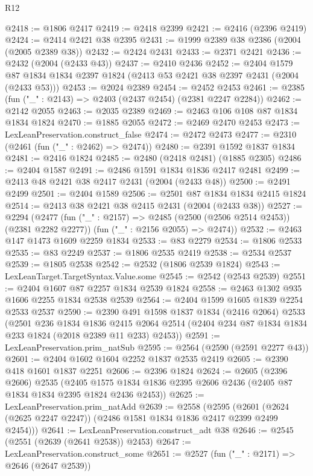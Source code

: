 \begin{lexlean}{R12}
\begin{coremodule}
@2418 := @1806 @2417
@2419 := @2418 @2399
@2421 := @2416 (@2396 @2419)
@2424 := @2414 @2421 @38 @2395
@2431 := @1999 @2389 @38 @2386 (@2004 (@2005 @2389 @38))
@2432 := @2424 @2431
@2433 := @2371 @2421
@2436 := @2432 (@2004 (@2433 @43))
@2437 := @2410 @2436
@2452 := @2404
    @1579
    @87
    @1834
    @1834
    @2397
    @1824
    (@2413 @53 @2421 @38 @2397 @2431 (@2004 (@2433 @53)))
@2453 := @2024 @2389
@2454 := @2452 @2453
@2461 := @2385 (fun ("_" : @2143) => @2403 (@2437 @2454) (@2381 @2247 @2284))
@2462 := @2142 @2055
@2463 := @2035 @2389
@2469 := @2463 @106 @108 @87 @1834 @1834 @1824
@2470 := @1885 @2055
@2472 := @2469 @2470 @2453
@2473 := LexLeanPreservation.construct_false
@2474 := @2472 @2473
@2477 := @2310 (@2461 (fun ("_" : @2462) => @2474))
@2480 := @2391 @1592 @1837 @1834
@2481 := @2416 @1824
@2485 := @2480 (@2418 @2481) (@1885 @2305)
@2486 := @2404 @1587
@2491 := @2486 @1591 @1834 @1836 @2417 @2481
@2499 := @2413 @48 @2421 @38 @2417 @2431 (@2004 (@2433 @48))
@2500 := @2491 @2499
@2501 := @2404 @1589
@2506 := @2501 @87 @1834 @1834 @2415 @1824
@2514 := @2413 @38 @2421 @38 @2415 @2431 (@2004 (@2433 @38))
@2527 := @2294
    (@2477
      (fun ("_" : @2157) => @2485 (@2500 (@2506 @2514 @2453)) (@2381 @2282 @2277))
      (fun ("_" : @2156 @2055) => @2474))
@2532 := @2463 @147 @1473 @1609 @2259 @1834
@2533 := @83 @2279
@2534 := @1806 @2533
@2535 := @83 @2249
@2537 := @1806 @2535 @2419
@2538 := @2534 @2537
@2539 := @1805 @2538
@2542 := @2532 (@1806 @2539 @1824)
@2543 := LexLeanTarget.TargetSyntax.Value.some
@2545 := @2542 (@2543 @2539)
@2551 := @2404 @1607 @87 @2257 @1834 @2539 @1824
@2558 := @2463 @1302 @935 @1606 @2255 @1834 @2538 @2539
@2564 := @2404 @1599 @1605 @1839 @2254 @2533 @2537
@2590 := @2390
    @491
    @1598
    @1837
    @1834
    (@2416 @2064)
    @2533
    (@2501
      @236
      @1834
      @1836
      @2415
      @2064
      @2514
      (@2404 @234 @87 @1834 @1834 @233 @1824 (@2018 @2389 @11 @233) @2453))
@2591 := LexLeanPreservation.prim_natSub
@2595 := @2564 (@2590 (@2591 @2277 @43))
@2601 := @2404 @1602 @1604 @2252 @1837 @2535 @2419
@2605 := @2390 @418 @1601 @1837 @2251
@2606 := @2396 @1824
@2624 := @2605
    (@2396 @2606)
    @2535
    (@2405 @1575 @1834 @1836 @2395 @2606 @2436 (@2405 @87 @1834 @1834 @2395 @1824 @2436 @2453))
@2625 := LexLeanPreservation.prim_natAdd
@2639 := @2558
    (@2595 (@2601 (@2624 (@2625 @2247 @2247)) (@2486 @1581 @1834 @1836 @2417 @2399 @2499 @2454)))
@2641 := LexLeanPreservation.construct_adt @38
@2646 := @2545 (@2551 (@2639 (@2641 @2538)) @2453)
@2647 := LexLeanPreservation.construct_some
@2651 := @2527 (fun ("_" : @2171) => @2646 (@2647 @2539))

\end{coremodule}
\end{lexlean}
